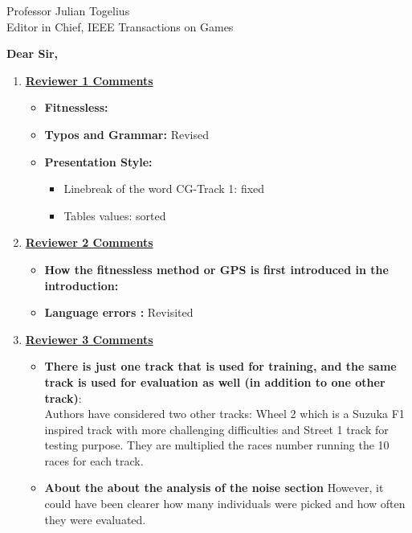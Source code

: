 \documentclass[10pt]{letter} %
\begin{document}

\begin{letter}{Professor Julian Togelius \\ Editor in Chief, IEEE Transactions on Games} %


\opening{\textbf{Dear Sir,}}


\begin{enumerate}
\item {\bf \underline{ Reviewer 1 Comments}}\\
\begin{itemize}
	\item {\bf Fitnessless:}
	\item {\bf Typos and Grammar:} Revised
	\item  {\bf Presentation Style:}
	\begin{itemize}
		\item Linebreak of the word CG-Track 1:  fixed
		\item Tables values: sorted
	\end{itemize}
		
\end{itemize}
\item {\bf \underline{ Reviewer 2 Comments}}\\

\begin{itemize}
	\item {\bf How the fitnessless method or GPS is first introduced in the introduction:}
	\item {\bf Language errors :} Revisited
	
\end{itemize}

\item {\bf \underline{ Reviewer 3 Comments}}\\

\begin{itemize}
	
	\item {\bf	There is just one track that is used for training, and the same track is used for evaluation as well (in addition to one other track)}:\\
	Authors have considered two other tracks: Wheel 2 which is a Suzuka F1 inspired track with more challenging difficulties and Street 1 track for testing purpose.
	They are multiplied the races number running the  10 races for each track.
	\item {\bf	About the  about the analysis of the noise section} However, it could have been clearer how many individuals were picked and how often they were evaluated.
	

\end{itemize}
\end{enumerate}
\end{letter}
\end{document}
